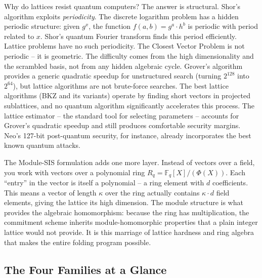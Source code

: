 \documentclass[
  11pt,
  openany]{report}
\begin{document}
Why do lattices resist quantum computers? The answer is structural. Shor's
algorithm exploits \emph{periodicity}. The discrete logarithm problem has a
hidden periodic structure: given \(g^x\), the function
\(f(a, b) = g^a \cdot h^b\) is periodic with period related to \(x\). Shor's
quantum Fourier transform finds this period efficiently. Lattice problems have
no such periodicity. The Closest Vector Problem is not periodic -- it is
geometric. The difficulty comes from the high dimensionality and the scrambled
basis, not from any hidden algebraic cycle. Grover's algorithm provides a
generic quadratic speedup for unstructured search (turning \(2^{128}\) into
\(2^{64}\)), but lattice algorithms are not brute-force searches. The best
lattice algorithms (BKZ and its variants) operate by finding short vectors in
projected sublattices, and no quantum algorithm significantly accelerates this
process. The lattice estimator -- the standard tool for selecting parameters --
accounts for Grover's quadratic speedup and still produces comfortable security
margins. Neo's 127-bit post-quantum security, for instance, already incorporates
the best known quantum attacks.

The Module-SIS formulation adds one more layer. Instead of vectors over a field,
you work with vectors over a polynomial ring
\(R_q = \mathbb{F}_q[X]/(\Phi(X))\). Each ``entry'' in the vector is itself a
polynomial -- a ring element with \(d\) coefficients. This means a vector of
length \(\kappa\) over the ring actually contains \(\kappa \cdot d\) field
elements, giving the lattice its high dimension. The module structure is what
provides the algebraic homomorphism: because the ring has multiplication, the
commitment scheme inherits module-homomorphic properties that a plain integer
lattice would not provide. It is this marriage of lattice hardness and ring
algebra that makes the entire folding program possible.

\subsection{The Four Families at a Glance}\label{the-four-families-at-a-glance}
\end{document}
